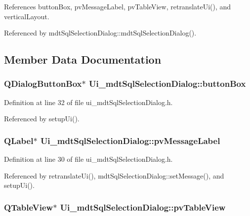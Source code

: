 References button\-Box, pv\-Message\-Label, pv\-Table\-View, retranslate\-Ui(), and vertical\-Layout.



Referenced by mdt\-Sql\-Selection\-Dialog\-::mdt\-Sql\-Selection\-Dialog().



\subsection{Member Data Documentation}
\hypertarget{class_ui__mdt_sql_selection_dialog_a46ea1a6b44d579fb64e6add76105a8df}{
\subsubsection[{button\-Box}]{\setlength{\rightskip}{0pt plus 5cm}Q\-Dialog\-Button\-Box$\ast$ Ui\-\_\-mdt\-Sql\-Selection\-Dialog\-::button\-Box}}\label{class_ui__mdt_sql_selection_dialog_a46ea1a6b44d579fb64e6add76105a8df}


Definition at line 32 of file ui\-\_\-mdt\-Sql\-Selection\-Dialog.\-h.



Referenced by setup\-Ui().

\hypertarget{class_ui__mdt_sql_selection_dialog_a82a1af17dadcc1a6efe2f14d249c14db}{
\subsubsection[{pv\-Message\-Label}]{\setlength{\rightskip}{0pt plus 5cm}Q\-Label$\ast$ Ui\-\_\-mdt\-Sql\-Selection\-Dialog\-::pv\-Message\-Label}}\label{class_ui__mdt_sql_selection_dialog_a82a1af17dadcc1a6efe2f14d249c14db}


Definition at line 30 of file ui\-\_\-mdt\-Sql\-Selection\-Dialog.\-h.



Referenced by retranslate\-Ui(), mdt\-Sql\-Selection\-Dialog\-::set\-Message(), and setup\-Ui().

\hypertarget{class_ui__mdt_sql_selection_dialog_a869b052bbdf1b6e19f13b5a29f23bbff}{
\subsubsection[{pv\-Table\-View}]{\setlength{\rightskip}{0pt plus 5cm}Q\-Table\-View$\ast$ Ui\-\_\-mdt\-Sql\-Selection\-Dialog\-::pv\-Table\-View}}\label{class_ui__mdt_sql_selection_dialog_a869b052bbdf1b6e19f13b5a29f23bbff}


